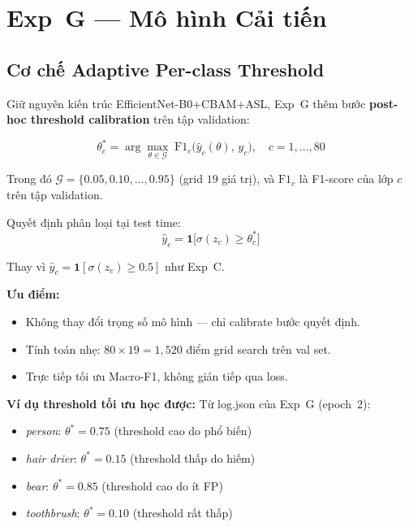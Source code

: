 \documentclass{article}
\begin{document}
\section{Exp~G --- Mô hình Cải tiến}

\subsection{Cơ chế Adaptive Per-class Threshold}

Giữ nguyên kiến trúc EfficientNet-B0+CBAM+ASL, Exp~G thêm bước
\textbf{post-hoc threshold calibration} trên tập validation:

\begin{equation}
  \theta_c^* = \arg\max_{\theta \in \mathcal{G}} \;
  \text{F1}_c\!\bigl(\hat{y}_c(\theta),\, y_c\bigr),
  \quad c = 1, \ldots, 80
\end{equation}

\noindent Trong đó $\mathcal{G} = \{0.05, 0.10, \ldots, 0.95\}$ (grid $19$ giá trị),
và $\text{F1}_c$ là F1-score của lớp $c$ trên tập validation.

Quyết định phân loại tại test time:
\begin{equation}
  \hat{y}_c = \mathbf{1}\!\bigl[\sigma(z_c) \geq \theta_c^*\bigr]
\end{equation}

\noindent Thay vì $\hat{y}_c = \mathbf{1}[\sigma(z_c) \geq 0.5]$ như Exp~C.

\textbf{Ưu điểm:}
\begin{itemize}[leftmargin=1.8em]
  \item Không thay đổi trọng số mô hình --- chỉ calibrate bước quyết định.
  \item Tính toán nhẹ: $80 \times 19 = 1{,}520$ điểm grid search trên val set.
  \item Trực tiếp tối ưu Macro-F1, không gián tiếp qua loss.
\end{itemize}

\textbf{Ví dụ threshold tối ưu học được:}
Từ log.json của Exp~G (epoch~2):
\begin{itemize}[leftmargin=1.8em]
  \item \textit{person}: $\theta^* = 0.75$ (threshold cao do phổ biến)
  \item \textit{hair drier}: $\theta^* = 0.15$ (threshold thấp do hiếm)
  \item \textit{bear}: $\theta^* = 0.85$ (threshold cao do ít FP)
  \item \textit{toothbrush}: $\theta^* = 0.10$ (threshold rất thấp)
\end{itemize}
\end{document}
